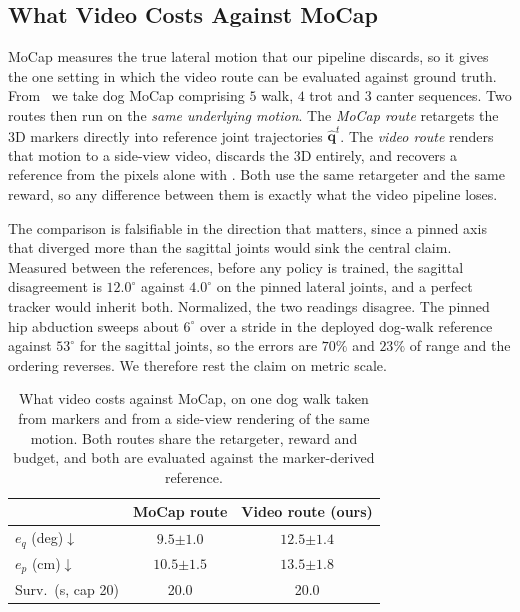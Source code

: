 \documentclass[letterpaper, 10 pt, conference]{ieeeconf}
\newcommand{\pmv}[2]{#1{\scriptstyle \pm #2}}
\begin{document}
\subsection{What Video Costs Against MoCap}\label{subsec:exp-mocap}
\noindent
MoCap measures the true lateral motion that our pipeline discards, so it gives the one setting in which the video route can be evaluated against ground truth. From~\cite{zhang2018modeadaptive} we take dog MoCap comprising $5$ walk, $4$ trot and $3$ canter sequences. Two routes then run on the \textit{same underlying motion}. The \textit{MoCap route} retargets the 3D markers directly into reference joint trajectories $\hat{\mathbf{q}}^t$. The \textit{video route} renders that motion to a side-view video, discards the 3D entirely, and recovers a reference from the pixels alone with \ourMethod. Both use the same retargeter and the same reward, so any difference between them is exactly what the video pipeline loses.

The comparison is falsifiable in the direction that matters, since a pinned axis that diverged more than the sagittal joints would sink the central claim. Measured between the references, before any policy is trained, the sagittal disagreement is $12.0^\circ$ against $4.0^\circ$ on the pinned lateral joints, and a perfect tracker would inherit both. Normalized, the two readings disagree. The pinned hip abduction sweeps about $6^\circ$ over a stride in the deployed dog-walk reference against $53^\circ$ for the sagittal joints, so the errors are $70\%$ and $23\%$ of range and the ordering reverses. We therefore rest the claim on metric scale.



\begin{table}[t]
\centering
\caption{What video costs against MoCap, on one dog walk taken from markers and from a side-view rendering of the same motion. Both routes share the retargeter, reward and budget, and both are evaluated against the marker-derived reference.}
\label{tab:mocap}
\begin{tabular}{@{}p{}cc@{}}
\toprule
& MoCap route & Video route (ours) \\
\midrule
$e_q$ (deg)$\downarrow$        & $\pmv{9.5}{1.0}$  & $\pmv{12.5}{1.4}$ \\
$e_p$ (cm)$\downarrow$         & $\pmv{10.5}{1.5}$ & $\pmv{13.5}{1.8}$ \\
Surv.\ (s, cap 20)              & 20.0        & 20.0 \\
\bottomrule
\end{tabular}
\end{table}
\end{document}
